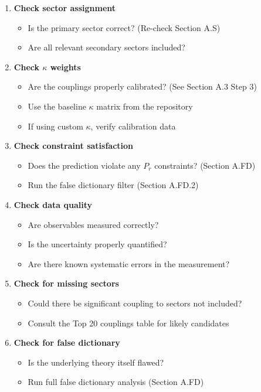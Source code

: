 \documentclass[13pt,a4paper]{article}
\begin{document}
	\begin{enumerate}
		\item \textbf{Check sector assignment} 
		\begin{itemize}
			\item Is the primary sector correct? (Re-check Section A.S)
			\item Are all relevant secondary sectors included?
		\end{itemize}
		
		\item \textbf{Check \(\kappa\) weights}
		\begin{itemize}
			\item Are the couplings properly calibrated? (See Section A.3 Step 3)
			\item Use the baseline \(\kappa\) matrix from the repository
			\item If using custom \(\kappa\), verify calibration data
		\end{itemize}
		
		\item \textbf{Check constraint satisfaction}
		\begin{itemize}
			\item Does the prediction violate any \(P_r\) constraints? (Section A.FD)
			\item Run the false dictionary filter (Section A.FD.2)
		\end{itemize}
		
		\item \textbf{Check data quality}
		\begin{itemize}
			\item Are observables measured correctly?
			\item Is the uncertainty properly quantified?
			\item Are there known systematic errors in the measurement?
		\end{itemize}
		
		\item \textbf{Check for missing sectors}
		\begin{itemize}
			\item Could there be significant coupling to sectors not included?
			\item Consult the Top 20 couplings table for likely candidates
		\end{itemize}
		
		\item \textbf{Check for false dictionary}
		\begin{itemize}
			\item Is the underlying theory itself flawed?
			\item Run full false dictionary analysis (Section A.FD)
		\end{itemize}
		

\end{enumerate}
\end{document}

